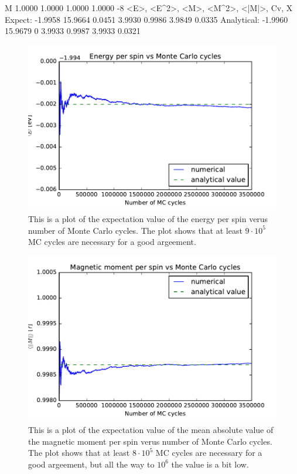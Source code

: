 M
   1.0000   1.0000
   1.0000   1.0000
-8
 <E>, <E^2>, <M>, <M^2>, <|M|>, Cv, X
Expect:
   -1.9958
   15.9664
    0.0451
    3.9930
    0.9986
   3.9849
   0.0335
Analytical:
   -1.9960
   15.9679
         0
    3.9933
    0.9987
    3.9933
    0.0321

\begin{figure}[H]
\includegraphics[width=\linewidth]{../results/4b/L_2_energy}\caption{This is a plot of the expectation value of the energy per spin verus number of Monte Carlo cycles. The plot shows that at least $ 9 \cdot 10^{5} $ MC cycles are necessary for a good argeement.}\label{fig:L_2_energy}
\end{figure}

\begin{figure}[H]
\includegraphics[width=\linewidth]{../results/4b/L_2_magnetic_abs}\caption{This is a plot of the expectation value of the mean absolute value of the magnetic moment per spin verus number of Monte Carlo cycles. The plot shows that at least $ 8 \cdot 10^{5} $ MC cycles are necessary for a good argeement, but all the way to $10^6$ the value is a bit low.}\label{fig:L_2_magnetic_abs}
\end{figure}

